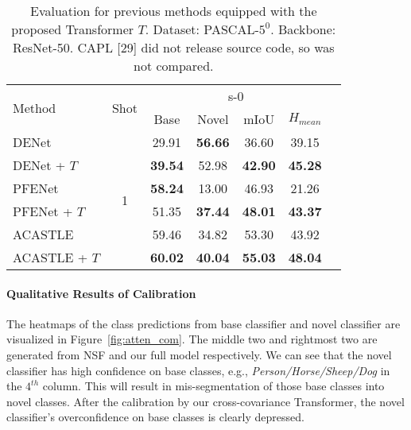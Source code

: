 \documentclass[journal]{IEEEtran}
\begin{document}
\begin{table}[ht]
    \centering
    \caption{Evaluation for previous methods equipped with the proposed Transformer $T$. Dataset: PASCAL-$5^{0}$. Backbone: ResNet-50. CAPL [29] did not release source code, so was not compared.}
\begin{tabular}{l|c|ccccc}
    \hline
         \multirow{2}{*}{Method} & \multirow{2}{*}{Shot} & \multicolumn{4}{c}{s-0} \\
         \cline{3-6}
          & & Base & Novel & mIoU & $H_{mean}$ \\
         \hline
         DENet & \multirow{6}{*}{1} & 29.91 & \textbf{56.66} & 36.60 & 39.15  \\
         DENet + $T$ & & \textbf{39.54} & 52.98 & \textbf{42.90} & \textbf{45.28}  \\
         \cline{3-6}
         PFENet & & \textbf{58.24} & 13.00 & 46.93 & 21.26 \\
         PFENet + $T$ & & 51.35 & \textbf{37.44} & \textbf{48.01} & \textbf{43.37} \\
         \cline{3-6}
         ACASTLE & & 59.46 & 34.82 & 53.30 & 43.92 \\
         ACASTLE + $T$ & & \textbf{60.02} & \textbf{40.04} & \textbf{55.03} & \textbf{48.04}  \\
    \hline
    \end{tabular}
    \label{tab:previous}
\end{table}

\paragraph{Qualitative Results of Calibration}
The heatmaps of the class predictions from base classifier and novel classifier are visualized in Figure~\ref{fig:atten_com}. The middle two and rightmost two are generated from NSF and our full model respectively.
We can see that the novel classifier has high confidence on base classes, e.g., \textit{Person/Horse/Sheep/Dog} in the $4^{th}$ column. 
This will result in mis-segmentation of those base classes into novel classes.
After the calibration by our cross-covariance Transformer, the novel classifier's overconfidence on base classes is clearly depressed.
\end{document}
